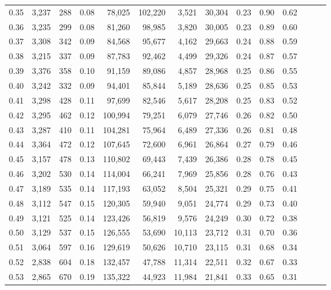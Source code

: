 \begin{tabular}{rrrrrrrrrrrrrr}
0.35 &  3,237 &  288 &  0.08 &   78,025 &  102,220 &   3,521 &  30,304 &  0.23 &  0.90 &      0.62 \\
0.36 &  3,235 &  299 &  0.08 &   81,260 &   98,985 &   3,820 &  30,005 &  0.23 &  0.89 &      0.60 \\
0.37 &  3,308 &  342 &  0.09 &   84,568 &   95,677 &   4,162 &  29,663 &  0.24 &  0.88 &      0.59 \\
0.38 &  3,215 &  337 &  0.09 &   87,783 &   92,462 &   4,499 &  29,326 &  0.24 &  0.87 &      0.57 \\
0.39 &  3,376 &  358 &  0.10 &   91,159 &   89,086 &   4,857 &  28,968 &  0.25 &  0.86 &      0.55 \\
0.40 &  3,242 &  332 &  0.09 &   94,401 &   85,844 &   5,189 &  28,636 &  0.25 &  0.85 &      0.53 \\
0.41 &  3,298 &  428 &  0.11 &   97,699 &   82,546 &   5,617 &  28,208 &  0.25 &  0.83 &      0.52 \\
0.42 &  3,295 &  462 &  0.12 &  100,994 &   79,251 &   6,079 &  27,746 &  0.26 &  0.82 &      0.50 \\
0.43 &  3,287 &  410 &  0.11 &  104,281 &   75,964 &   6,489 &  27,336 &  0.26 &  0.81 &      0.48 \\
0.44 &  3,364 &  472 &  0.12 &  107,645 &   72,600 &   6,961 &  26,864 &  0.27 &  0.79 &      0.46 \\
0.45 &  3,157 &  478 &  0.13 &  110,802 &   69,443 &   7,439 &  26,386 &  0.28 &  0.78 &      0.45 \\
0.46 &  3,202 &  530 &  0.14 &  114,004 &   66,241 &   7,969 &  25,856 &  0.28 &  0.76 &      0.43 \\
0.47 &  3,189 &  535 &  0.14 &  117,193 &   63,052 &   8,504 &  25,321 &  0.29 &  0.75 &      0.41 \\
0.48 &  3,112 &  547 &  0.15 &  120,305 &   59,940 &   9,051 &  24,774 &  0.29 &  0.73 &      0.40 \\
0.49 &  3,121 &  525 &  0.14 &  123,426 &   56,819 &   9,576 &  24,249 &  0.30 &  0.72 &      0.38 \\
0.50 &  3,129 &  537 &  0.15 &  126,555 &   53,690 &  10,113 &  23,712 &  0.31 &  0.70 &      0.36 \\
0.51 &  3,064 &  597 &  0.16 &  129,619 &   50,626 &  10,710 &  23,115 &  0.31 &  0.68 &      0.34 \\
0.52 &  2,838 &  604 &  0.18 &  132,457 &   47,788 &  11,314 &  22,511 &  0.32 &  0.67 &      0.33 \\
0.53 &  2,865 &  670 &  0.19 &  135,322 &   44,923 &  11,984 &  21,841 &  0.33 &  0.65 &      0.31 \\

\end{tabular}
